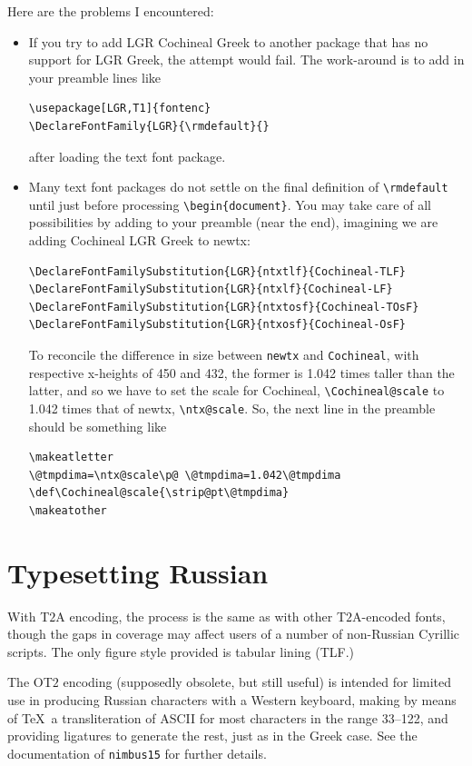 \documentclass[11pt]{article}
\begin{document}
Here are the problems I encountered:
\begin{itemize}
\item
If you try to add LGR Cochineal Greek to another package that has no support for LGR Greek, the attempt would fail. The work-around is to add in your preamble lines like
\begin{verbatim}
\usepackage[LGR,T1]{fontenc}
\DeclareFontFamily{LGR}{\rmdefault}{}
\end{verbatim}
after loading the text font package.
\item
Many text font packages do not settle on the final definition of \verb|\rmdefault| until just  before processing \verb|\begin{document}|. You may take care of all possibilities by adding to your preamble (near the end), imagining we are adding Cochineal LGR Greek to newtx:
\begin{verbatim}
\DeclareFontFamilySubstitution{LGR}{ntxtlf}{Cochineal-TLF}
\DeclareFontFamilySubstitution{LGR}{ntxlf}{Cochineal-LF}
\DeclareFontFamilySubstitution{LGR}{ntxtosf}{Cochineal-TOsF}
\DeclareFontFamilySubstitution{LGR}{ntxosf}{Cochineal-OsF}
\end{verbatim}
To reconcile the difference in size between {\tt newtx} and {\tt Cochineal}, with respective x-heights of 450 and 432, the former is 1.042 times taller than the latter, and so we have to set the scale for Cochineal, \verb|\Cochineal@scale| to 1.042 times that of newtx, \verb|\ntx@scale|. So, the next line in the preamble should be something like
\begin{verbatim}
\makeatletter
\@tmpdima=\ntx@scale\p@ \@tmpdima=1.042\@tmpdima
\def\Cochineal@scale{\strip@pt\@tmpdima}
\makeatother
\end{verbatim}
\end{itemize}

 \section*{Typesetting Russian}
With T$2$A encoding, the process is the same as with other T$2$A-encoded fonts, though the gaps in coverage may affect users of a number of non-Russian Cyrillic scripts. The only figure style provided is tabular lining (TLF.)
{}

The OT$2$ encoding (supposedly obsolete, but still useful) is intended for limited use in producing Russian characters with a Western keyboard, making by means of \TeX\ a transliteration of ASCII for most characters in the range 33--122, and providing ligatures to generate the rest, just as in the Greek case. See the documentation of {\tt nimbus15} for further details.
{}
\end{document}
